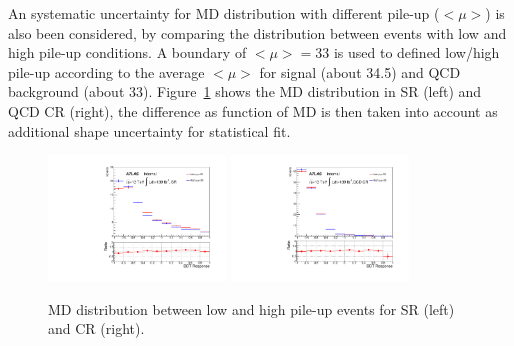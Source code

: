 An systematic uncertainty for MD distribution with different pile-up ($<\mu>$) is also been considered,
by comparing the distribution between events with low and high pile-up conditions.
A boundary of $<\mu> = 33$ is used to defined low/high pile-up according to the average $<\mu>$ for signal (about 34.5) and QCD background (about 33).
Figure~\ref{fig:syst_exp_pu} shows the MD distribution in SR (left) and QCD CR (right), the difference as function of MD is then taken into account as additional shape uncertainty for statistical fit.
\begin{figure}[H]
  \centering
  \includegraphics[width=0.42\textwidth]{figures/VBSZZ/syst/pu_uncer_BDT_SR.pdf}
  \includegraphics[width=0.42\textwidth]{figures/VBSZZ/syst/pu_uncer_BDT_CR.pdf}
  \caption{MD distribution between low and high pile-up events for SR (left) and CR (right).}
  \label{fig:syst_exp_pu}
\end{figure}

